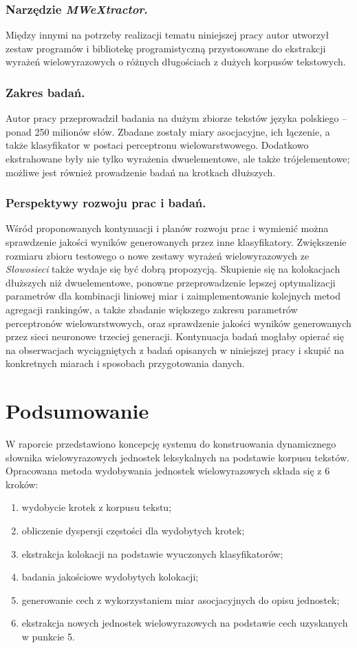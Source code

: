 \documentclass[11pt,a4paper]{llncs}
\begin{document}
\subsubsection{Narzędzie \protect\textit{MWeXtractor}.}
Między innymi na potrzeby realizacji tematu niniejszej pracy autor utworzył zestaw programów i bibliotekę programistyczną przystosowane do ekstrakcji wyrażeń wielowyrazowych o różnych długościach z dużych korpusów tekstowych.


\subsubsection{Zakres badań.}
Autor pracy przeprowadził badania na dużym zbiorze tekstów języka polskiego -- ponad 250 milionów słów. 
Zbadane zostały miary asocjacyjne, ich łączenie, a także klasyfikator w postaci perceptronu wielowarstwowego.
Dodatkowo ekstrahowane były nie tylko wyrażenia dwuelementowe, ale także trójelementowe; możliwe jest również prowadzenie badań na krotkach dłuższych.


\subsubsection{Perspektywy rozwoju prac i badań.}
Wśród proponowanych kontynuacji i planów rozwoju prac i wymienić można sprawdzenie jakości wyników generowanych przez inne klasyfikatory.
Zwiększenie rozmiaru zbioru testowego o nowe zestawy wyrażeń wielowyrazowych ze \emph{Słowosieci} także wydaje się być dobrą propozycją.
Skupienie się na kolokacjach dłuższych niż dwuelementowe, ponowne przeprowadzenie lepszej optymalizacji parametrów dla kombinacji liniowej miar i zaimplementowanie kolejnych metod agregacji rankingów, a także zbadanie większego zakresu parametrów perceptronów wielowarstwowych, oraz sprawdzenie jakości wyników generowanych przez sieci neuronowe trzeciej generacji.
Kontynuacja badań mogłaby opierać się na obserwacjach wyciągniętych z badań opisanych w niniejszej pracy i skupić na konkretnych miarach i sposobach przygotowania danych.


\section{Podsumowanie} \label{s5}

W raporcie przedstawiono koncepcję systemu do konstruowania dynamicznego słownika wielowyrazowych jednostek leksykalnych na podstawie korpusu tekstów. Opracowana metoda wydobywania jednostek wielowyrazowych składa się z 6 kroków:
\begin{enumerate}
	\item wydobycie krotek z korpusu tekstu;
	\item obliczenie dyspersji częstości dla wydobytych krotek;
	\item ekstrakcja kolokacji na podstawie wyuczonych klasyfikatorów;
	\item badania jakościowe wydobytych kolokacji;
	\item generowanie cech z wykorzystaniem miar asocjacyjnych do opisu jednostek;
	\item ekstrakcja nowych jednostek wielowyrazowych na podstawie cech uzyskanych w punkcie 5.
\end{enumerate}
\end{document}

